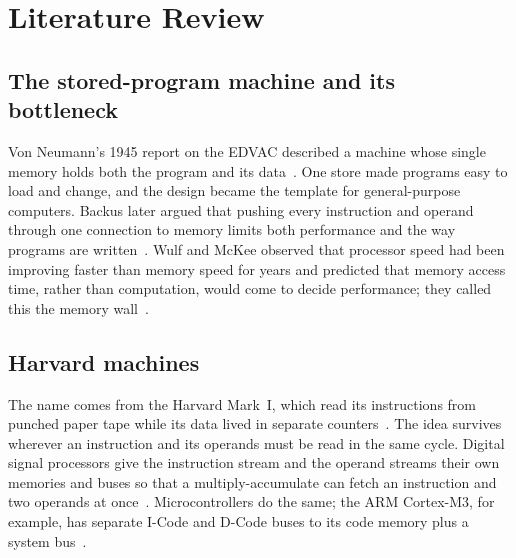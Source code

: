 \documentclass[conference]{IEEEtran}
\begin{document}
\section{Literature Review}

\subsection{The stored-program machine and its bottleneck}
Von Neumann's 1945 report on the EDVAC described a machine whose single memory holds both the program and its data~\cite{edvac}. One store made programs easy to load and change, and the design became the template for general-purpose computers. Backus later argued that pushing every instruction and operand through one connection to memory limits both performance and the way programs are written~\cite{backus}. Wulf and McKee observed that processor speed had been improving faster than memory speed for years and predicted that memory access time, rather than computation, would come to decide performance; they called this the memory wall~\cite{wulf}.

\subsection{Harvard machines}
The name comes from the Harvard Mark~I, which read its instructions from punched paper tape while its data lived in separate counters~\cite{aiken}. The idea survives wherever an instruction and its operands must be read in the same cycle. Digital signal processors give the instruction stream and the operand streams their own memories and buses so that a multiply-accumulate can fetch an instruction and two operands at once~\cite{dsp}. Microcontrollers do the same; the ARM Cortex-M3, for example, has separate I-Code and D-Code buses to its code memory plus a system bus~\cite{yiu}.
\end{document}
